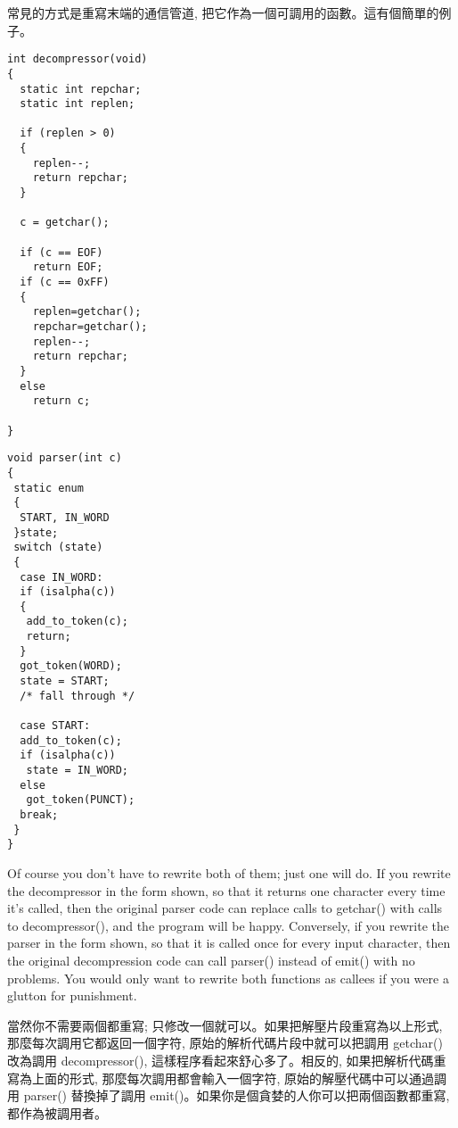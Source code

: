 \documentclass[12pt]{article}
\begin{document}
\begin{CJK}{UTF8}{bsmi}
常見的方式是重寫末端的通信管道, 把它作為一個可調用的函數。這有個簡單的例子。 

\newpage
\begin{multicols}{2}

\begin{lstlisting}[caption=decompression, basicstyle=\footnotesize]
int decompressor(void) 
{
  static int repchar;
  static int replen;

  if (replen > 0) 
  {
    replen--;
    return repchar;
  }

  c = getchar();

  if (c == EOF)
    return EOF;
  if (c == 0xFF) 
  {
    replen=getchar();
    repchar=getchar();
    replen--;
    return repchar;
  }
  else
    return c;

}
\end{lstlisting}

\begin{lstlisting}[caption=parsesr, basicstyle=\footnotesize, breaklines=true]
void parser(int c) 
{
 static enum 
 {
  START, IN_WORD
 }state;
 switch (state) 
 {
  case IN_WORD:
  if (isalpha(c)) 
  {
   add_to_token(c);
   return;
  }
  got_token(WORD);
  state = START;
  /* fall through */

  case START:
  add_to_token(c);
  if (isalpha(c))
   state = IN_WORD;
  else
   got_token(PUNCT);
  break;
 }
}
\end{lstlisting}
\end{multicols}

 Of course you don't have to rewrite both of them; just one will do. If you rewrite the decompressor in the form shown, so that it returns one character every time it's called, then the original parser code can replace calls to getchar() with calls to decompressor(), and the program will be happy. Conversely, if you rewrite the parser in the form shown, so that it is called once for every input character, then the original decompression code can call parser() instead of emit() with no problems. You would only want to rewrite both functions as callees if you were a glutton for punishment.

當然你不需要兩個都重寫; 只修改一個就可以。如果把解壓片段重寫為以上形式, 那麼每次調用它都返回一個字符, 原始的解析代碼片段中就可以把調用 getchar() 改為調用 decompressor(), 這樣程序看起來舒心多了。相反的, 如果把解析代碼重寫為上面的形式, 那麼每次調用都會輸入一個字符, 原始的解壓代碼中可以通過調用 parser() 替換掉了調用 emit()。如果你是個貪婪的人你可以把兩個函數都重寫, 都作為被調用者。


\end{CJK}
\end{document}
